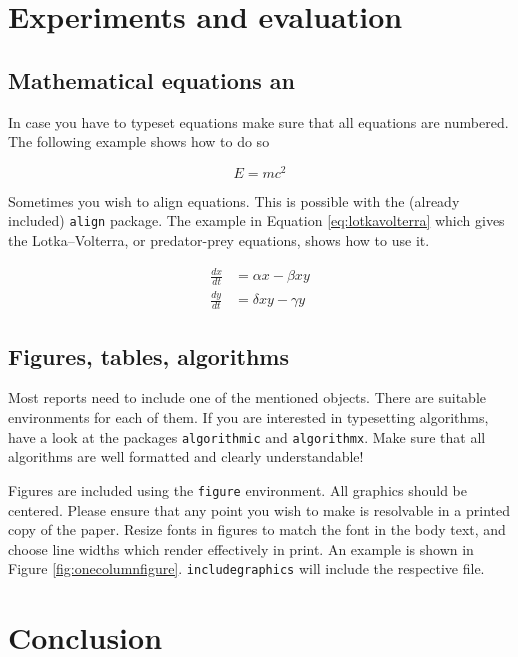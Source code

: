 \documentclass[10pt,a4paper,twoside,journal]{IEEEtran}
\begin{document}
\section{Experiments and evaluation}
\label{sc:evaluation}

\subsection{Mathematical equations an}
In case you have to typeset equations make sure that all equations are numbered.
The following example shows how to do so

\begin{equation}
	E = mc^2
\end{equation}

Sometimes you wish to align equations. This is possible with the (already
included) \texttt{align} package. The example in Equation \autoref{eq:lotkavolterra}
which gives the Lotka--Volterra, or predator-prey equations, shows how to use
it.

\begin{align}\label{eq:lotkavolterra}
	\frac{dx}{dt} &= \alpha x - \beta x y \\
	\frac{dy}{dt} &= \delta x y - \gamma y
\end{align}

\subsection{Figures, tables, algorithms}

Most reports need to include one of the mentioned objects. There are suitable
environments for each of them. If you are interested in typesetting algorithms,
have a look at the packages \texttt{algorithmic} and \texttt{algorithmx}. Make
sure that all algorithms are well formatted and clearly understandable!

Figures are included using the \texttt{figure} environment. All graphics should
be centered.  Please ensure that any point you wish to make is resolvable in a
printed copy of the paper. Resize fonts in figures to match the font in the
body text, and choose line widths which render effectively in print. An example
is shown in Figure \autoref{fig:onecolumnfigure}.
\texttt{includegraphics} will include the respective file.

\section{Conclusion}
\label{sc:conclusion}
\end{document}
